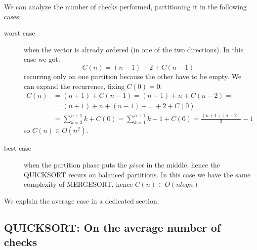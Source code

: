 We can analyze the number of checks performed, partitioning it in the
following cases:
\begin{description}
\item[worst case] when the vector is already ordered (in one of the
  two directions). In this case we got:
  \begin{displaymath}
    C(n) = (n-1)+2 + C(n-1)
  \end{displaymath}
  recurring only on one partition because the other have to be
  empty. We can expand the recurrence, fixing $C(0) = 0$:
  \begin{displaymath}
    \begin{split}
      C(n) &= (n+1) + C(n-1) = (n+1) + n + C(n-2) = \\
      &= (n+1) + n + (n-1) + \ldots + 2 + C(0) = \\
      &= \sum_{k=2}^{n+1}{k} + C(0) = \sum_{k=1}^{n+1}{k} -1 + C(0) =
      \frac{(n+1)(n+2)}{2} - 1
    \end{split}
  \end{displaymath}
  so $C(n) \in O(n^2)$.
\item[best case] when the partition phase puts the $pivot$ in the
  middle, hence the QUICKSORT recurs on balanced partitions. In this
  case we have the same complexity of MERGESORT, hence $C(n) \in O(n
  logn)$
\end{description}
We explain the average case in a dedicated section.

\subsection{QUICKSORT: On the average number of checks}

